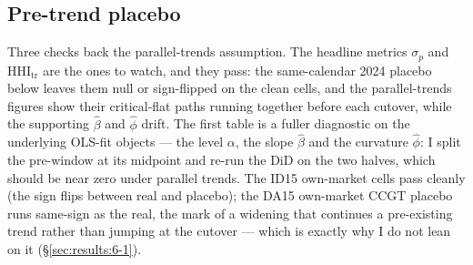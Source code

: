 \documentclass[11pt,a4paper]{article}
\theoremstyle{definition}
\theoremstyle{remark}
\theoremstyle{plain}
\begin{document}
\subsection{Pre-trend placebo}\label{sec:5b}
Three checks back the parallel-trends assumption. The headline metrics $\sigma_p$ and $\text{HHI}_{\text{tr}}$ are the ones to watch, and they pass: the same-calendar 2024 placebo below leaves them null or sign-flipped on the clean cells, and the parallel-trends figures show their critical-flat paths running together before each cutover, while the supporting $\hat\beta$ and $\hat\phi$ drift. The first table is a fuller diagnostic on the underlying OLS-fit objects --- the level $\alpha$, the slope $\hat\beta$ and the curvature $\hat\phi$: I split the pre-window at its midpoint and re-run the DiD on the two halves, which should be near zero under parallel trends. The ID15 own-market cells pass cleanly (the sign flips between real and placebo); the DA15 own-market CCGT placebo runs same-sign as the real, the mark of a widening that continues a pre-existing trend rather than jumping at the cutover --- which is exactly why I do not lean on it (\S\ref{sec:results:6-1}).
\end{document}
